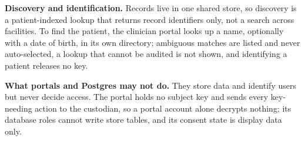 \textbf{Discovery and identification.} Records live in one shared store, so
discovery is a patient-indexed lookup that returns record identifiers only,
not a search across facilities. %
To find the patient, the clinician portal looks up a name, optionally with a
date of birth, in its own directory; ambiguous matches are listed and never
auto-selected, a lookup that cannot be audited is not shown, and identifying
a patient releases no key. %

\textbf{What portals and Postgres may not do.} They store data and identify
users but never decide access. %
The portal holds no subject key and sends every key-needing action to the
custodian, so a portal account alone decrypts nothing; its database roles
cannot write store tables, and its consent state is display data only. %
